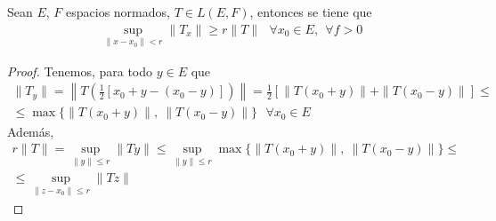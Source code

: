 
\begin{lema}
    Sean $E$, $F$ espacios normados, $T\in L(E,F)$, entonces se tiene que 
    \begin{gather*}
        \sup\limits_{\|x-x_0\|<r} \|T_x\| \geq r \|T\| \ \ \ \forall x_0\in E,\ \ \forall f>0
    \end{gather*}

    \begin{proof}
        Tenemos, para todo $y\in E$ que
        \begin{gather*}
            \|T_y\| = \left\|T\left(\frac{1}{2}[x_0 +y - (x_0 -y)]\right)\right\| = \frac{1}{2}\left[ \|T(x_0+y)\| + \|T(x_0-y)\| \right] \leq\\
            \leq \max\{\|T(x_0+y)\|,\ \|T(x_0-y)\|\}\ \ \ \forall x_0\in E
        \end{gather*}
        Además,
        \begin{gather*}
            r\|T\| = \sup\limits_{\|y\| \leq r} \|Ty\| \leq \sup\limits_{\|y\| \leq r} \max\{\|T(x_0+y)\|,\ \|T(x_0-y)\|\} \leq \\
            \leq \sup\limits_{\|z-x_0\| \leq r} \|Tz\|
        \end{gather*}
    \end{proof}
\end{lema}

